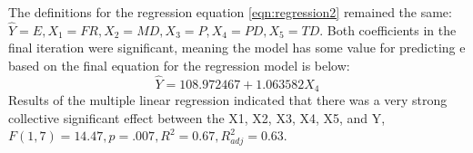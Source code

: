 \documentclass[thesis]{fputhesis}
\newcommand{\ra}[1]{\renewcommand{\arraystretch}{#1}}
\begin{document}
\begin{body}
The definitions for the regression equation \ref{eqn:regression2} remained the same: \(\hat{Y} = E, X_1 = FR, X_2 = MD, X_3 = P, X_4 = PD, X_5 = TD\). Both coefficients in the final iteration were significant, meaning the model has some value for predicting \acrlong{e} based on the final equation for the regression model is below:
\begin{equation}
    \label{eqn:regression2}
    \hat{Y} = 108.972467 + 1.063582X_4
\end{equation}
Results of the multiple linear regression indicated that there was a very strong collective significant effect between the X1, X2, X3, X4, X5, and Y, \(F(1, 7) = 14.47, p = .007, R^2 = 0.67, R^2_{adj} = 0.63\).

\newpage
\begin{table}[h!]\centering
\caption{Study 2: Coefficients of Regression Significance Test}\label{tab:regression2}
\ra{1.2}
\end{table}
\end{body}
\end{document}
